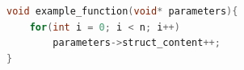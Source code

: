 \documentclass[11pt]{article}
\begin{document}
\begin{lstlisting}[language=C, caption={example}]
void example_function(void* parameters){
    for(int i = 0; i < n; i++)
        parameters->struct_content++;
}
\end{lstlisting}



\end{document}
